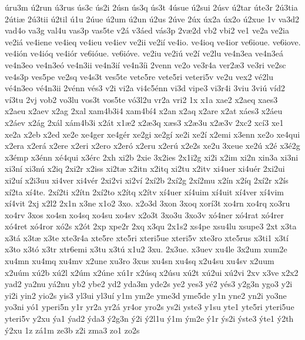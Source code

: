{^^faru3m
^^fa2run
^^fa3rus
^^fas3c
^^fas2i
2^^fasn
^^fas3q
^^fas3t
4^^fasue
^^fa2sui
2^^fasv
^^fa2tar
^^fate3r
2^^fa3tia
2^^fati^^e6
2^^fa3tii
^^fa2til
^^fa1u
2^^faue
^^fa2um
^^fa2un
^^fa2us
2^^fave
2^^fax
^^fax2a
^^fax2o
^^fa2xue
1v
va3d2
vad4o
va3g
val4u
vas3p
vas5te
v2^^e1
v3^^e1ed
v^^e1s3p
2v^^e62d
vb2
vbi2
ve1
ve2a
ve2ia
ve2i^^e1
ve4iene
ve4ieq
ve4ieu
ve4iev
ve2ii
ve2i^^ed
ve4io.
ve4ioq
ve4ior
ve6ioue.
ve6iove.
ve4i^^f3n
ve4i^^f3q
ve4i^^f3r
ve6i^^f3ue.
ve6i^^f3ve.
ve2iu
ve2i^^fa
ve2^^ed
ve2lu
ve4n3ea
ve4n3e^^e1
ve4n3eo
ve4n3e^^f3
ve4n3ii
ve4n3i^^ed
ve4n3^^edi
2venn
ve2o
ve3r4a
ver2^^e63
ve3ri
ve2sc
ve4s3p
ves5pe
ve2sq
ve4s3t
ves5te
vete5re
vete5ri
veteri5v
ve2u
vex2
v^^e92lu
v^^e94n3eo
v^^e94n3ii
2v^^e9nn
v^^e9s3
v2i
vi2a
vi4c5^^e9nn
vi3d
vipe3
vi3r4i
3viu
3vi^^fa
v^^edd2
v^^ed3tu
2vj
vob2
vo3lu
vos3t
vos5te
v^^f33l2u
vr2a
vri2
1x
x1a
xae2
x2aeq
xaes3
x2aeu
x2aev
x2ag
2xal
xam4b3i4
xam4b^^ed4
x2an
x2aq
x2are
x2at
x^^e1es3
x2^^e1eu
x2^^e1ev
x2^^e1g
2x^^e1l
x^^e1m4b3i
x2^^e1t
x1^^e62
x2^^e63q
x^^e6s3
x2^^e63u
x2^^e63v
2xc2
xc^^ed3
xe1
xe2a
x2eb
x2ed
xe2e
xe4ger
xe4g^^e9r
xe2gi
xe2g^^ed
xe2i
xe2^^ed
x2emi
x3enn
xe2o
xe4qui
x2era
x2er^^e1
x2ere
x2eri
x2ero
x2er^^f3
x2eru
x2er^^fa
x2e2s
xe2u
3xeue
xe2^^fa
x2^^e9
x3^^e92g
x3^^e9mp
x3^^e9nn
x^^e94qui
x3^^e9rc
2xh
xi2b
2xie
3x2ies
2x1i2g
xi2i
x2im
xi2n
xin3a
xi3ni
xi3n^^ed
xi3n^^fa
x2iq
2xi2r
x2iss
xi2t^^e6
x2itn
x2itq
xi2tu
x2itv
xi4uer
xi4u^^e9r
2xi2ui
xi2u^^ed
x2i3uu
xi4ver
xi4v^^e9r
2xi2vi
xi2v^^ed
2x^^ed2b
2x^^ed2g
2x^^ed2mu
x2^^edn
x2^^edq
2x^^ed2r
x2^^eds
x^^ed2ta
x^^ed4te.
2x^^ed2ti
x2^^edtn
2x^^ed2to
x2^^edtq
x2^^edtv
x^^ed4uer
x^^ed4uim
x^^ed4uit
x^^ed4ver
x^^ed4vim
x^^ed4vit
2xj
x2l2
2x1n
x3ne
x1o2
3xo.
x2o3d
3xon
3xoq
xor^^ed3t
xo4rn
xo4rq
xo3ru
xo4rv
3xos
xo4sn
xo4sq
xo4su
xo4sv
x2o3t
3xo3u
3xo3v
x^^f34ner
x^^f34rat
x^^f34rer
x^^f34ret
x^^f34ror
x^^f32s
x2^^f3t
2xp
xpe2r
2xq
x3qu
2x1s2
xs4pe
xsu4lu
xsupe3
2xt
x3ta
x3t^^e1
x3t^^e6
x3te
xte3r4a
xte5re
xte5ri
xteri5ue
xteri5v
xte3ro
xte5rus
x3ti1
x3t^^ed
x3to
x3t^^f3
x3tr
xtr6emi
x3tu
x3t^^fa
x1u2
3xu.
2x3ue.
x3uev
xu4le
3x2um
xum2e
xu4mn
xu4mq
xu4mv
x2une
xu3ro
3xus
xu4sn
xu4sq
x2u4su
xu4sv
x2uum
x2u^^fam
x^^fa2b
x^^fa2l
x2^^fam
x2^^fane
x^^fa1r
x2^^fasq
x2^^fasu
x^^fa2t
x^^fa2ui
x^^fa2vi
2xv
x3ve
x2x2
yad2
ya2nu
y^^e12nu
yb2
ybe2
yd2
yda3m
yde2s
ye2
yes3
y^^e92
y^^e9s3
y2g3n
ygo3
y2i
yi2i
yin2
yio2s
yis3
yl3ui
yl3u^^ed
y1m
ym2e
yme3d
yme5de
y1n
yne2
yn2i
yo3ne
yo3ni
y^^f31
yperi5n
y1r
yr2a
yr2^^e1
yr4or
yro2s
ys2i
yste3
y1su
yte1
yte5ri
yteri5ue
yteri5v
y2xu
^^fda1
^^fdad2
^^fdda3
^^fd2g3n
^^fd2i
^^fd2l1u
^^fd1m
^^fdm2e
^^fd1r
^^fds2i
^^fdste3
^^fdte1
^^fd2th
^^fd2xu
1z
z^^e11m
ze3b
z2i
zma3
zo1
zo2s
}
\egroup
